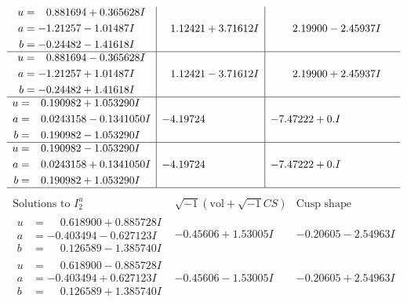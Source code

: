 \documentclass[1p]{elsarticle_modified}
\theoremstyle{definition}
\newcommand{\I}{\sqrt{-1}}
\begin{document}
$$\begin{array}{c|c|c}
\begin{aligned}
u &= \phantom{-}0.881694 + 0.365628 I \\
a &= -1.21257 - 1.01487 I \\
b &= -0.24482 - 1.41618 I\end{aligned}
 & \phantom{-}1.12421 + 3.71612 I & \phantom{-}2.19900 - 2.45937 I \\ \hline\begin{aligned}
u &= \phantom{-}0.881694 - 0.365628 I \\
a &= -1.21257 + 1.01487 I \\
b &= -0.24482 + 1.41618 I\end{aligned}
 & \phantom{-}1.12421 - 3.71612 I & \phantom{-}2.19900 + 2.45937 I \\ \hline\begin{aligned}
u &= \phantom{-}0.190982 + 1.053290 I \\
a &= \phantom{-}0.0243158 - 0.1341050 I \\
b &= \phantom{-}0.190982 - 1.053290 I\end{aligned}
 & -4.19724\phantom{ +0.000000I} & -7.47222 + 0. I\phantom{ +0.000000I} \\ \hline\begin{aligned}
u &= \phantom{-}0.190982 - 1.053290 I \\
a &= \phantom{-}0.0243158 + 0.1341050 I \\
b &= \phantom{-}0.190982 + 1.053290 I\end{aligned}
 & -4.19724\phantom{ +0.000000I} & -7.47222 + 0. I\phantom{ +0.000000I}\\
 \hline 
 \end{array}$$\newpage$$\begin{array}{c|c|c}  
\text{Solutions to }I^u_{2}& \I (\text{vol} + \sqrt{-1}CS) & \text{Cusp shape}\\
 \hline 
\begin{aligned}
u &= \phantom{-}0.618900 + 0.885728 I \\
a &= -0.403494 - 0.627123 I \\
b &= \phantom{-}0.126589 - 1.385740 I\end{aligned}
 & -0.45606 + 1.53005 I & -0.20605 - 2.54963 I \\ \hline\begin{aligned}
u &= \phantom{-}0.618900 - 0.885728 I \\
a &= -0.403494 + 0.627123 I \\
b &= \phantom{-}0.126589 + 1.385740 I\end{aligned}
 & -0.45606 - 1.53005 I & -0.20605 + 2.54963 I \\ \hline\begin{aligned}

\end{aligned}
\end{array}$$
\end{document}

